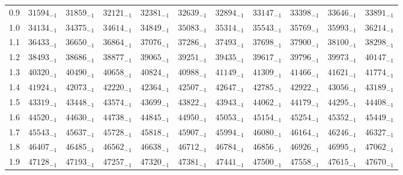 \documentclass[10pt, a4paper]{article}
\begin{document}
\begin{center}
\begin{longtable}{c || c c c c c | c c c c c}
        0.9 & \({31594}_{-1}\) & \({31859}_{-1}\) & \({32121}_{-1}\) & \({32381}_{-1}\) & \({32639}_{-1}\) & \({32894}_{-1}\) & \({33147}_{-1}\) & \({33398}_{-1}\) & \({33646}_{-1}\) & \({33891}_{-1}\)\\
        1.0 & \({34134}_{-1}\) & \({34375}_{-1}\) & \({34614}_{-1}\) & \({34849}_{-1}\) & \({35083}_{-1}\) & \({35314}_{-1}\) & \({35543}_{-1}\) & \({35769}_{-1}\) & \({35993}_{-1}\) & \({36214}_{-1}\)\\
        1.1 & \({36433}_{-1}\) & \({36650}_{-1}\) & \({36864}_{-1}\) & \({37076}_{-1}\) & \({37286}_{-1}\) & \({37493}_{-1}\) & \({37698}_{-1}\) & \({37900}_{-1}\) & \({38100}_{-1}\) & \({38298}_{-1}\)\\
        1.2 & \({38493}_{-1}\) & \({38686}_{-1}\) & \({38877}_{-1}\) & \({39065}_{-1}\) & \({39251}_{-1}\) & \({39435}_{-1}\) & \({39617}_{-1}\) & \({39796}_{-1}\) & \({39973}_{-1}\) & \({40147}_{-1}\)\\
        1.3 & \({40320}_{-1}\) & \({40490}_{-1}\) & \({40658}_{-1}\) & \({40824}_{-1}\) & \({40988}_{-1}\) & \({41149}_{-1}\) & \({41309}_{-1}\) & \({41466}_{-1}\) & \({41621}_{-1}\) & \({41774}_{-1}\)\\
        1.4 & \({41924}_{-1}\) & \({42073}_{-1}\) & \({42220}_{-1}\) & \({42364}_{-1}\) & \({42507}_{-1}\) & \({42647}_{-1}\) & \({42785}_{-1}\) & \({42922}_{-1}\) & \({43056}_{-1}\) & \({43189}_{-1}\)\\
        1.5 & \({43319}_{-1}\) & \({43448}_{-1}\) & \({43574}_{-1}\) & \({43699}_{-1}\) & \({43822}_{-1}\) & \({43943}_{-1}\) & \({44062}_{-1}\) & \({44179}_{-1}\) & \({44295}_{-1}\) & \({44408}_{-1}\)\\
        1.6 & \({44520}_{-1}\) & \({44630}_{-1}\) & \({44738}_{-1}\) & \({44845}_{-1}\) & \({44950}_{-1}\) & \({45053}_{-1}\) & \({45154}_{-1}\) & \({45254}_{-1}\) & \({45352}_{-1}\) & \({45449}_{-1}\)\\
        1.7 & \({45543}_{-1}\) & \({45637}_{-1}\) & \({45728}_{-1}\) & \({45818}_{-1}\) & \({45907}_{-1}\) & \({45994}_{-1}\) & \({46080}_{-1}\) & \({46164}_{-1}\) & \({46246}_{-1}\) & \({46327}_{-1}\)\\
        1.8 & \({46407}_{-1}\) & \({46485}_{-1}\) & \({46562}_{-1}\) & \({46638}_{-1}\) & \({46712}_{-1}\) & \({46784}_{-1}\) & \({46856}_{-1}\) & \({46926}_{-1}\) & \({46995}_{-1}\) & \({47062}_{-1}\)\\
        1.9 & \({47128}_{-1}\) & \({47193}_{-1}\) & \({47257}_{-1}\) & \({47320}_{-1}\) & \({47381}_{-1}\) & \({47441}_{-1}\) & \({47500}_{-1}\) & \({47558}_{-1}\) & \({47615}_{-1}\) & \({47670}_{-1}\)\\

\end{longtable}
\end{center}
\end{document}
